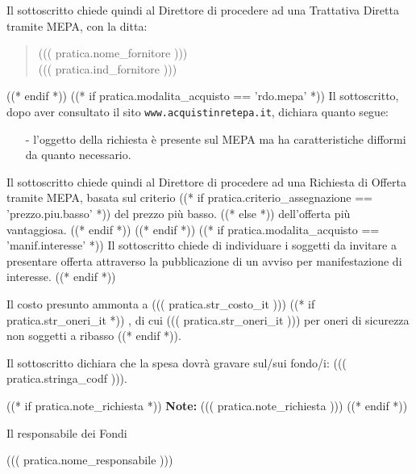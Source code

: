 \documentclass[a4paper,12pt]{letter}
\begin{document}
Il sottoscritto chiede quindi al Direttore di procedere ad una Trattativa Diretta
tramite MEPA, con la ditta:
\begin{quote}
((( pratica.nome_fornitore )))\\
((( pratica.ind_fornitore )))
\end{quote}

((* endif *))
((* if pratica.modalita_acquisto == 'rdo.mepa' *))
Il sottoscritto, dopo aver consultato il sito {\tt www.acquistinretepa.it},
dichiara quanto segue:

\begin{itemize}
\item[-] l'oggetto della richiesta è presente sul MEPA ma ha caratteristiche difformi
da quanto necessario.
\end{itemize}

Il sottoscritto chiede quindi al Direttore di procedere ad una Richiesta di Offerta
tramite MEPA, basata sul criterio %
   ((* if pratica.criterio_assegnazione == 'prezzo.piu.basso' *)) %
del prezzo più basso.
   ((* else *)) %
dell'offerta più vantaggiosa.
   ((* endif *))
((* endif *))
((* if pratica.modalita_acquisto == 'manif.interesse' *))
Il sottoscritto chiede di individuare i soggetti da invitare a presentare offerta
attraverso la pubblicazione di un avviso per manifestazione di interesse.
((* endif *))

Il costo presunto ammonta a ((( pratica.str_costo_it )))%
((* if pratica.str_oneri_it *))%
, di cui ((( pratica.str_oneri_it ))) per oneri di sicurezza non soggetti a ribasso%
((* endif *)).

Il sottoscritto dichiara che la spesa dovrà gravare sul/sui fondo/i:
((( pratica.stringa_codf ))). 

((* if pratica.note_richiesta *))
{\bf Note:} ((( pratica.note_richiesta )))
((* endif *))

\vspace{0.5cm}

\begin{flushright}
\begin{minipage}[c]{6cm}
Il responsabile dei Fondi

((( pratica.nome_responsabile )))

\end{minipage}
\end{flushright}
\end{document}

